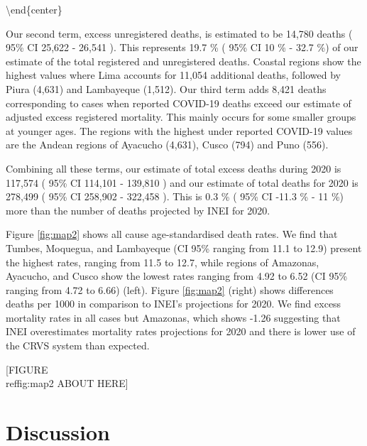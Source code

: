 \documentclass[
]{article}
\begin{document}
\textbackslash end\{center\}

Our second term, excess unregistered deaths, is estimated to be 14,780 deaths ( 95\% CI 25,622 - 26,541 ). This represents 19.7 \% ( 95\% CI 10 \% - 32.7 \%) of our estimate of the total registered and unregistered deaths. Coastal regions show the highest values where Lima accounts for 11,054 additional deaths, followed by Piura (4,631) and Lambayeque (1,512). Our third term adds 8,421 deaths corresponding to cases when reported COVID-19 deaths exceed our estimate of adjusted excess registered mortality. This mainly occurs for some smaller groups at younger ages. The regions with the highest under reported COVID-19 values are the Andean regions of Ayacucho (4,631), Cusco (794) and Puno (556).

Combining all these terms, our estimate of total excess deaths during 2020 is 117,574 ( 95\% CI 114,101 - 139,810 ) and our estimate of total deaths for 2020 is 278,499 ( 95\% CI 258,902 - 322,458 ). This is 0.3 \% ( 95\% CI -11.3 \% - 11 \%) more than the number of deaths projected by INEI for 2020.

Figure \ref{fig:map2} shows all cause age-standardised death rates. We find that Tumbes, Moquegua, and Lambayeque (CI 95\% ranging from 11.1 to 12.9) present the highest rates, ranging from 11.5 to 12.7, while regions of Amazonas, Ayacucho, and Cusco show the lowest rates ranging from 4.92 to 6.52 (CI 95\% ranging from 4.72 to 6.66) (left). Figure \ref{fig:map2} (right) shows differences deaths per 1000 in comparison to INEI's projections for 2020. We find excess mortality rates in all cases but Amazonas, which shows -1.26 suggesting that INEI overestimates mortality rates projections for 2020 and there is lower use of the CRVS system than expected.

\begin{center}
[FIGURE \\ref{fig:map2} ABOUT HERE]
\end{center}

\hypertarget{discussion}{%
\section{Discussion}\label{discussion}}
\end{document}
